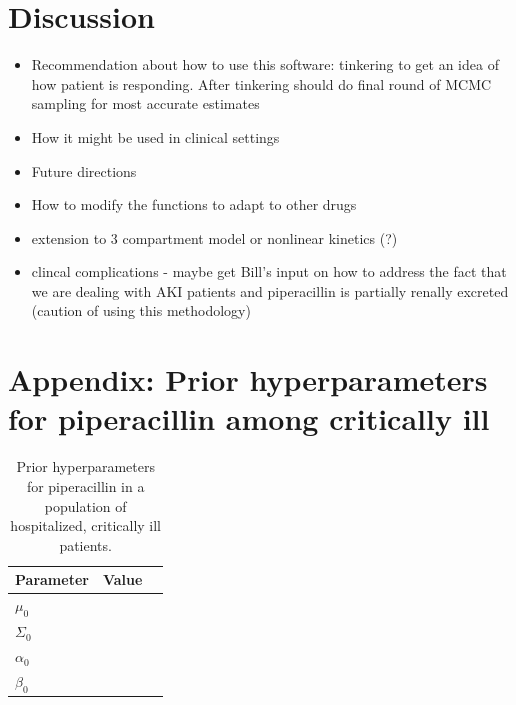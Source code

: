 \documentclass{article}\usepackage[]{graphicx}\usepackage[]{color}
\begin{document}


\section{Discussion}

\begin{itemize}

  \item Recommendation about how to use this software: tinkering to get an idea of how patient is responding. After tinkering should do final round of MCMC sampling for most accurate estimates
  \item How it might be used in clinical settings
  \item Future directions
  \item How to modify the functions to adapt to other drugs
  \item extension to 3 compartment model or nonlinear kinetics (?)
  \item clincal complications - maybe get Bill's input on how to address the fact that we are dealing with AKI patients and piperacillin is partially renally excreted (caution of using this methodology)

\end{itemize}



\section{Appendix: Prior hyperparameters for piperacillin among critically ill}
\begin{center}
\begin{table}
\begin{tabular}{lll} \hline
Parameter & Value \\ \hline
$\mu_0$ & \\
$\Sigma_0$ & \\
$\alpha_0$ & \\
$\beta_0$  & \\
\hline
\end{tabular}
\caption{Prior hyperparameters for piperacillin in a population of hospitalized, critically ill patients.}\label{tab:hyp}
\end{table}
\end{center}
\end{document}
